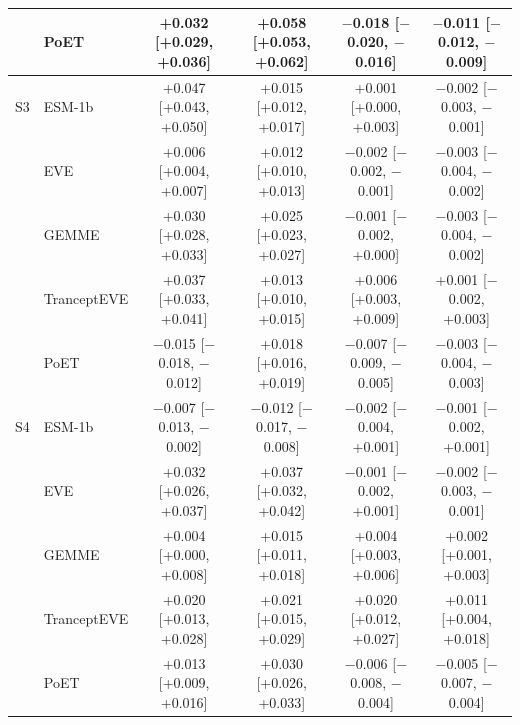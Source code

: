 \begin{tabular}{llcccc}
 & PoET & +0.032 [+0.029, +0.036] & +0.058 [+0.053, +0.062] & $-$0.018 [$-$0.020, $-$0.016] & $-$0.011 [$-$0.012, $-$0.009] \\
\midrule
S3 & ESM-1b & +0.047 [+0.043, +0.050] & +0.015 [+0.012, +0.017] & +0.001 [+0.000, +0.003] & $-$0.002 [$-$0.003, $-$0.001] \\
 & EVE & +0.006 [+0.004, +0.007] & +0.012 [+0.010, +0.013] & $-$0.002 [$-$0.002, $-$0.001] & $-$0.003 [$-$0.004, $-$0.002] \\
 & GEMME & +0.030 [+0.028, +0.033] & +0.025 [+0.023, +0.027] & $-$0.001 [$-$0.002, +0.000] & $-$0.003 [$-$0.004, $-$0.002] \\
 & TranceptEVE & +0.037 [+0.033, +0.041] & +0.013 [+0.010, +0.015] & +0.006 [+0.003, +0.009] & +0.001 [$-$0.002, +0.003] \\
 & PoET & $-$0.015 [$-$0.018, $-$0.012] & +0.018 [+0.016, +0.019] & $-$0.007 [$-$0.009, $-$0.005] & $-$0.003 [$-$0.004, $-$0.003] \\
\midrule
S4 & ESM-1b & $-$0.007 [$-$0.013, $-$0.002] & $-$0.012 [$-$0.017, $-$0.008] & $-$0.002 [$-$0.004, +0.001] & $-$0.001 [$-$0.002, +0.001] \\
 & EVE & +0.032 [+0.026, +0.037] & +0.037 [+0.032, +0.042] & $-$0.001 [$-$0.002, +0.001] & $-$0.002 [$-$0.003, $-$0.001] \\
 & GEMME & +0.004 [+0.000, +0.008] & +0.015 [+0.011, +0.018] & +0.004 [+0.003, +0.006] & +0.002 [+0.001, +0.003] \\
 & TranceptEVE & +0.020 [+0.013, +0.028] & +0.021 [+0.015, +0.029] & +0.020 [+0.012, +0.027] & +0.011 [+0.004, +0.018] \\
 & PoET & +0.013 [+0.009, +0.016] & +0.030 [+0.026, +0.033] & $-$0.006 [$-$0.008, $-$0.004] & $-$0.005 [$-$0.007, $-$0.004] \\
\bottomrule
\end{tabular}
